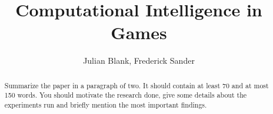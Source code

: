 \documentclass{llncs}
\begin{document}
\mainmatter

\title{Computational Intelligence in Games}%
\author{Julian Blank, Frederick Sander}%

\maketitle

\begin{abstract}
Summarize the paper in a paragraph of two. It should contain at least 70 and at most 150 words. You should motivate the research done, give some details about the experiments run and briefly mention the most important findings. 
\end{abstract}










\newpage



\end{document}
